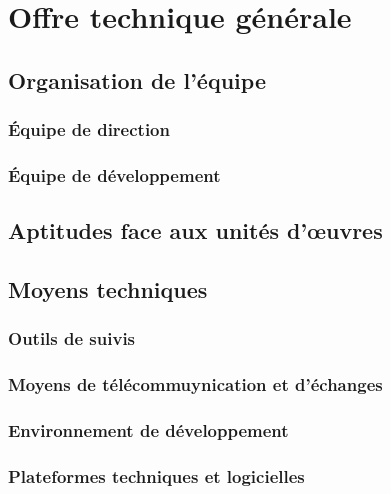 	\chapter{Offre technique générale}
	
	

	\section{Organisation de l'équipe}
	\subsection{Équipe de direction}
	\subsection{Équipe de développement}
	\section{Aptitudes face aux unités d'œuvres}
	\section{Moyens techniques}
	\subsection{Outils de suivis}
	\subsection{Moyens de télécommuynication et d'échanges}
	\subsection{Environnement de développement}
	\subsection{Plateformes techniques et logicielles}